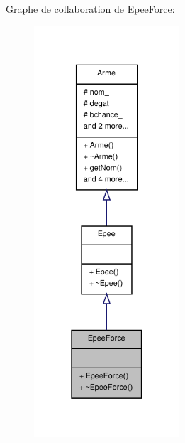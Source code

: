 Graphe de collaboration de Epee\-Force\-:
\nopagebreak
\begin{figure}[H]
\begin{center}
\leavevmode
\includegraphics[width=154pt]{class_epee_force__coll__graph}
\end{center}
\end{figure}
